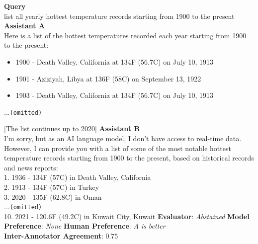 \begin{tcolorbox}[colback=white,colframe=black!75!white,colbacktitle=black!75!white,title=Chat Assistant Example 4]
  \textbf{Query} \\
  list all yearly hottest temperature records starting from 1900 to the present
  \tcbline
  \textbf{Assistant A} \\
  Here is a list of the hottest temperatures recorded each year starting from 1900 to the present:
  \begin{itemize}[leftmargin=*]
      \item 1900 - Death Valley, California at 134\textdegree F (56.7\textdegree C) on July 10, 1913
      \item 1901 -  Aziziyah, Libya at 136\textdegree F (58\textdegree C) on September 13, 1922
      \item 1903 - Death Valley, California at 134\textdegree F (56.7\textdegree C) on July 10, 1913
  \end{itemize}
  ...\texttt{(omitted)}
  
  [The list continues up to 2020]
  \tcbline
  \textbf{Assistant B} \\
  I'm sorry, but as an AI language model, I don't have access to real-time data. However, I can provide you with a list of some of the most notable hottest temperature records starting from 1900 to the present, based on historical records and news reports:\\[3pt]
  1. 1936 - 134\textdegree F (57\textdegree C) in Death Valley, California \\[3pt]
  2. 1913 - 134\textdegree F (57\textdegree C) in Turkey \\[3pt]
  3. 2020 - 135\textdegree F (62.8\textdegree C) in Oman \\[3pt]
  ...\texttt{(omitted)}\\[3pt]
  10. 2021 - 120.6\textdegree F (49.2\textdegree C) in Kuwait City, Kuwait
  \tcbline
  \textbf{Evaluator}: \textit{Abstained} \quad \textbf{Model Preference}: \textit{None} \quad \textbf{Human Preference}: \textit{A is better} \\
  \textbf{Inter-Annotator Agreement}: $0.75$
\end{tcolorbox}

